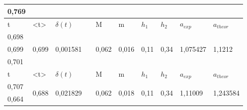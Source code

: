 \documentclass[a4paper,12pt]{article}
\begin{document}
\begin{table}[htp]
\begin{tabular}{@{}|l|l|l|l|l|l|l|l|l|l|@{}}
0,769 &                            &                           &                            &                        &                        &                       &                       &                                               &                                               \\\hline
t     & \textless{}t\textgreater{} & $\delta(t)$               &                            & M                      & m                      & $h_1$                 & $h_2$                 & \multicolumn{1}{l}{$a_{exp}$}                 & $a_{theor}$                                   \\\hline
0,698 & \multirow{3}{*}{0,699}     & \multirow{3}{*}{0,001581} &                            & \multirow{3}{*}{0,062} & \multirow{3}{*}{0,016} & \multirow{3}{*}{0,11} & \multirow{3}{*}{0,34} & \multicolumn{1}{l}{\multirow{3}{*}{1,075427}} & \multirow{3}{*}{1,1212}                       \\
0,699 &                            &                           &                            &                        &                        &                       &                       & \multicolumn{1}{l}{}                          &                                               \\
0,701 &                            &                           &                            &                        &                        &                       &                       & \multicolumn{1}{l}{}                          &                                               \\\hline
t     & \textless{}t\textgreater{} & $\delta(t)$               &                            & M                      & m                      & $h_1$                 & $h_2$                 & \multicolumn{1}{l}{$a_{exp}$}                 & $a_{theor}$                                   \\\hline
0,707 & \multirow{3}{*}{0,688}     & \multirow{3}{*}{0,021829} &                            & \multirow{3}{*}{0,062} & \multirow{3}{*}{0,018} & \multirow{3}{*}{0,11} & \multirow{3}{*}{0,34} & \multicolumn{1}{l}{\multirow{3}{*}{1,11009}}  & \multicolumn{1}{r}{\multirow{3}{*}{1,243584}} \\
0,664 &                            &                           &                            &                        &                        &                       &                       & \multicolumn{1}{l}{}                          & \multicolumn{1}{r}{}                          \\

\end{tabular}
\end{table}
\end{document}
